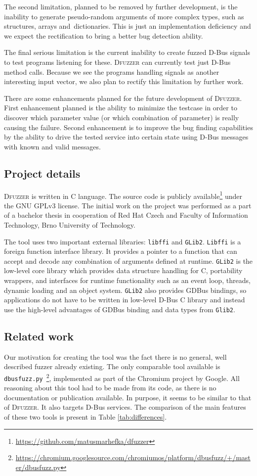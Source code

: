 \documentclass[conference]{IEEEtran}
\begin{document}
The second limitation, planned to be removed by further development, is the
inability to generate pseudo-random arguments of more complex types, such as 
structures, arrays and~dictionaries. This is just an implementation deficiency
and we expect the rectification to bring a better bug detection ability. 


The final serious limitation is the current inability to create fuzzed D-Bus
signals to test programs listening for these. \textsc{Dfuzzer} can currently
test just D-Bus method calls. Because we see the programs handling signals as
another interesting input vector, we also plan to rectify this limitation by
further work.


There are some enhancements planned for the future development of
\textsc{Dfuzzer}. First enhancement planned is the ability to minimize the
testcase in order to discover which parameter value (or which combination of
parameter) is really causing the failure. Second enhancement is to improve the
bug finding capabilities by the ability to drive the tested service into certain
state using D-Bus messages with known and valid messages.


\subsection{Project details}
\textsc{Dfuzzer} is written in C language. The source code is publicly
available\footnote{\url{https://github.com/matusmarhefka/dfuzzer}} under the GNU
GPLv3 license. The initial work on the project was performed as a part of a bachelor
thesis in cooperation of Red Hat Czech and Faculty of Information Technology, Brno
University of Technology.

The tool uses two important external libraries: \texttt{libffi} and
\texttt{GLib2}. \texttt{Libffi} is a foreign function interface library. It
provides a pointer to a function that can accept and decode any combination of
arguments defined at runtime.  \texttt{GLib2} is the low-level core library
which provides data structure handling for C, portability wrappers, and
interfaces for runtime functionality such as an event loop, threads, dynamic
loading and an object system.  \texttt{GLib2} also provides GDBus bindings, so
applications do not have to be written in low-level D-Bus C library and instead
use the high-level advantages of GDBus binding and data types from
\texttt{Glib2}.

\subsection{Related work}
Our motivation for creating the tool was the fact there is no general,
well described fuzzer already existing. The only comparable tool available is
\texttt{dbusfuzz.py}~\footnote{\url{https://chromium.googlesource.com/chromiumos/platform/dbusfuzz/+/master/dbusfuzz.py}},
implemented as part of the Chromium project by Google. All reasoning about this
tool had to be made from its code, as there is no documentation or publication
available. In purpose, it seems to be similar to that of \textsc{Dfuzzer}. It
also targets D-Bus services. The comparison of the main features of these two
tools is present in Table \ref{tab:differences}. 
\end{document}
